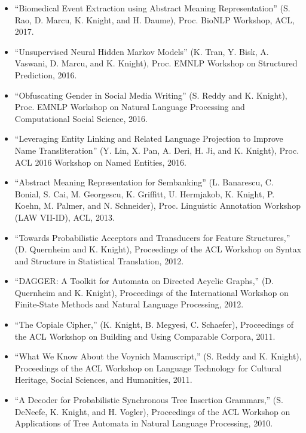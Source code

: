 \begin{itemize}

\item ``Biomedical Event Extraction using Abstract Meaning Representation'' (S. Rao, D. Marcu, K. Knight, and H. Daume), Proc. BioNLP Workshop, ACL, 2017. 

\item ``Unsupervised Neural Hidden Markov Models'' (K. Tran, Y. Bisk, A. Vaswani, D. Marcu, and K. Knight), Proc. EMNLP Workshop on Structured Prediction, 2016. 
\item ``Obfuscating Gender in Social Media Writing'' (S. Reddy and K. Knight), Proc. EMNLP Workshop on Natural Language Processing and Computational Social Science, 2016. 

\item ``Leveraging Entity Linking and Related Language Projection to Improve Name Transliteration'' (Y. Lin, X. Pan, A. Deri, H. Ji, and K. Knight), Proc. ACL 2016 Workshop on Named Entities, 2016. 

\item ``Abstract Meaning Representation for Sembanking'' (L. Banarescu, C. Bonial, S. Cai, M. Georgescu, K. Griffitt, U. Hermjakob, K. Knight, P. Koehn, M. Palmer, and N. Schneider), Proc. Linguistic Annotation Workshop (LAW VII-ID), ACL, 2013.

\item ``Towards Probabilistic Acceptors and Transducers for Feature Structures,'' (D. Quernheim and K. Knight), 
Proceedings of the
ACL Workshop on Syntax and Structure in Statistical Translation, 2012.

\item ``DAGGER: A Toolkit for Automata on Directed Acyclic Graphs,'' (D. Quernheim and K. Knight), 
Proceedings of the 
International Workshop on Finite-State Methods and Natural Language Processing, 2012. 

\item ``The Copiale Cipher,''
(K. Knight, B. Megyesi, C. Schaefer), 
Proceedings of the
ACL Workshop on Building and Using Comparable Corpora, 2011.

\item ``What We Know About the Voynich Manuscript,''
(S. Reddy and K. Knight), Proceedings of the ACL Workshop on
Language Technology for Cultural Heritage, Social Sciences, and
Humanities, 2011.

\item ``A Decoder for Probabilistic Synchronous Tree Insertion Grammars,''
(S. DeNeefe, K. Knight, and H. Vogler), Proceedings of the ACL Workshop on
Applications of Tree Automata in Natural Language Processing, 2010.


\end{itemize}
